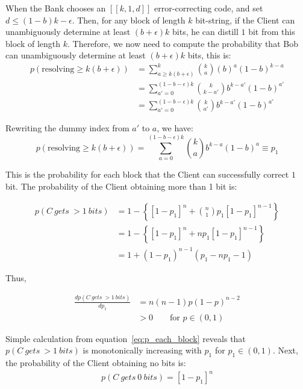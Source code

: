 \documentclass[%
 reprint,
superscriptaddress,
 amsmath,amssymb,
 aps,
]{revtex4-2}
\begin{document}
When the Bank chooses an $[[k, 1, d]]$ error-correcting code, and set $d \le(1-b)k-\epsilon$. Then, for any block of length $k$ bit-string, if the Client can unambiguously determine at least $(b+\epsilon)k$ bits, he can distill $1$ bit from this block of length $k$. Therefore, we now need to compute the probability that Bob can unambiguously determine at least $\left(b+\epsilon\right)k$ bits, this is:
\begin{equation}
\begin{split}
    p(\text{resolving}\ge k(b+\epsilon)) &= \sum_{a\ge k(b+\epsilon)}^k \binom{k}{a}\left(b\right)^a\left(1-b\right)^{k-a}\\
    &=\sum_{a'=0}^{(1-b-\epsilon)k}\binom{k}{k-a'}b^{k-a'}(1-b)^{a'}\\
    &=\sum_{a'=0}^{(1-b-\epsilon)k}\binom{k}{a'}b^{k-a'}(1-b)^{a'}
\end{split}
\end{equation}

Rewriting the dummy index from $a'$ to $a$, we have:
\begin{equation}
    p(\text{resolving}\ge k(b+\epsilon)) = \sum_{a=0}^{(1-b-\epsilon)k}\binom{k}{a}b^{k-a}(1-b)^{a}\equiv p_1
    \label{eq:p_each_block}
\end{equation}


This is the probability for each block that the Client can successfully correct $1$ bit. The probability of the Client obtaining more than 1 bit is:

\begin{equation}
\begin{split}
    p(C\ gets\ > 1\ bits) &= 1-\left\{[1-p_1]^n+ \binom{n}{1} p_1[1-p_1]^{n-1}\right\}\\ 
    &= 1-\left\{[1-p_1]^n+np_1[1-p_1]^{n-1}\right\}\\
    &=1 + (1 - p_1)^{n-1} (p_1 - n p_1 - 1)
\end{split}
\label{eq:C_cheated}
\end{equation}

Thus, 

\begin{equation}
\begin{split}
    \frac{dp(C\ gets\ > 1\ bits)}{dp_1}&=n(n-1)p(1 - p)^{n-2}\\
    &>0\qquad \text{for $p\in(0, 1)$}
\end{split}
\end{equation}

Simple calculation from equation~\ref{eq:p_each_block} reveals that $p(C\ gets\ > 1\ bits)$ is monotonically increasing with $p_1$ for $p_1\in(0, 1)$. Next, the probability of the Client obtaining no bits is:
\begin{equation}
\begin{split}
    p(C\ gets\ 0\ bits) =[1-p_1]^n
    \label{eq:C_failed}
\end{split}
\end{equation}
\end{document}
